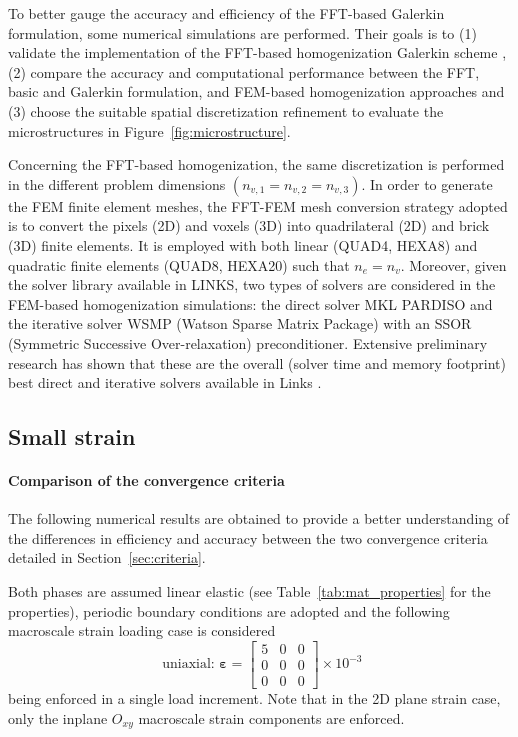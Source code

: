 To better gauge the accuracy and efficiency of the FFT-based Galerkin formulation, some numerical simulations are performed.
Their goals is to (1) validate the implementation of the FFT-based homogenization Galerkin scheme \citep{vondrejc_fft-based_2014, zeman_finite_2017, de_geus_finite_2017}, (2) compare the accuracy and computational performance between the FFT, basic \citep{moulinec_fast_1994} and Galerkin formulation, and FEM-based homogenization approaches and (3) choose the suitable spatial discretization refinement to evaluate the microstructures in Figure~\ref{fig:microstructure}.

Concerning the FFT-based homogenization, the same discretization is performed in the different problem dimensions \(\left(n_{v, 1}=n_{v, 2}=n_{v, 3}\right)\).
In order to generate the FEM finite element meshes, the FFT-FEM mesh conversion strategy adopted is to convert the pixels (2D) and voxels (3D) into quadrilateral (2D) and brick (3D) finite elements.
It is employed with both linear (QUAD4, HEXA8) and quadratic finite elements (QUAD8, HEXA20) such that \(n_{e}=n_{v}\).
Moreover, given the solver library available in LINKS, two types of solvers are considered in the FEM-based homogenization simulations: the direct solver MKL PARDISO \citep{schenk2001pardiso, schenk2004solving} and the iterative solver WSMP (Watson Sparse Matrix Package) \citep{gupta_improved_2002, gupta_wsmp_2002} with an SSOR (Symmetric Successive Over-relaxation) preconditioner.
Extensive preliminary research has shown that these are the overall (solver time and memory footprint) best direct and iterative solvers available in Links \citep{cardoso_coelho_election_2019}.

\subsection{Small strain}

\paragraph{Comparison of the convergence criteria}
The following numerical results are obtained to provide a better understanding of the differences in efficiency and accuracy between the two convergence criteria detailed in Section~\ref{sec:criteria}.

Both phases are assumed linear elastic (see Table~\ref{tab:mat_properties} for the properties), periodic boundary conditions are adopted and the following macroscale strain loading case is considered
\begin{equation}
\text { uniaxial: } \bm{\varepsilon}=\left[\begin{array}{lll}
5 & 0 & 0 \\
0 & 0 & 0 \\
0 & 0 & 0
\end{array}\right] \times 10^{-3}
\end{equation}
being enforced in a single load increment.
Note that in the 2D plane strain case, only the inplane \(O_{x y}\) macroscale strain components are enforced.

